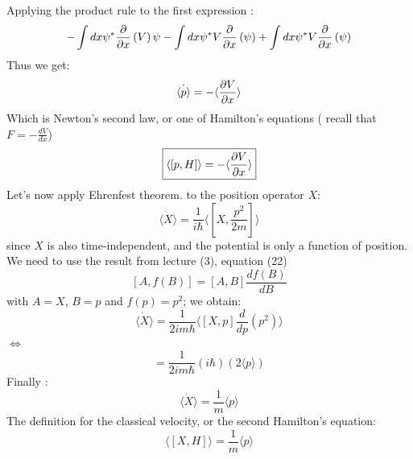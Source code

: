   Applying the product rule to the first expression :
  \[
  - \int dx \psi ^* \dfrac{\partial}{\partial x}\left( V \right)  \psi - \int dx \psi ^* V \dfrac{\partial}{\partial x}\left( \psi \right)  + \int dx \psi ^* V \dfrac{\partial}{\partial x}\left( \psi \right) 
  \]
  Thus we get:
  \begin{equation}
  \dot{\langle p\rangle }  = - \langle  \dfrac{\partial V}{\partial x}  \rangle
  \end{equation}
  Which is Newton's second law, or one of Hamilton's equations ( recall that $ F= - \frac{ d V}{dx}$)
  \begin{equation}
  \boxed{
  	\langle [ p, H]\rangle = - \langle  \dfrac{\partial V}{\partial x}  \rangle
  }
  \end{equation}
  Let's now apply Ehrenfest theorem. to the position operator $X$:
  \[
  \dot{\langle X \rangle } = \frac{1}{i \hbar} \langle [ X, \frac{p^2}{2m}]\rangle
  \]
  since $X$ is also time-independent, and the potential is only a function of position. We need to use the result from lecture (3), equation (22) 
  \[
  [A, f(B)] = [ A, B] \frac{ d f(B)}{dB}
  \]
  with $ A = X$,  $ B = p$ and $ f(p) = p^2$; we obtain:
  \[
  \dot{\langle X \rangle } = \frac{1}{2i m \hbar} \langle [ X, p] \frac{d}{dp} ( p^2)\rangle
  \]
  $\Leftrightarrow $
  \[
  = \frac{1}{2 i m \hbar} ( i\hbar) (2 \langle p \rangle)
  \]
  Finally :
  \begin{equation}
  \dot{\langle X \rangle } = \frac{1}{m} \langle p \rangle
  \end{equation}
  The definition for the classical velocity, or the second Hamilton's equation:
  \begin{equation}
  \boxed{
  	\langle [ X, H]\rangle = \frac{1}{m} \langle p \rangle
  }
  \end{equation}
  
